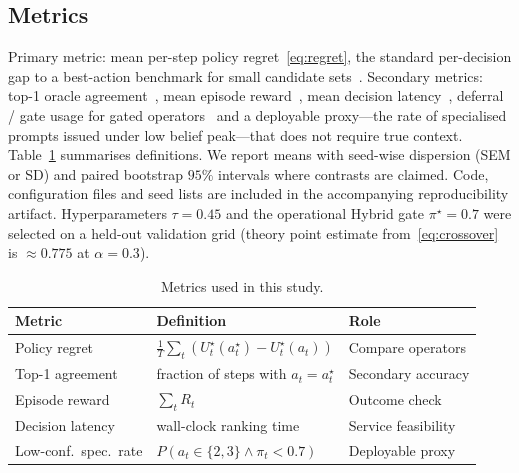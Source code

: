 \documentclass[journal]{IEEEtran}
\begin{document}
\subsection{Metrics}
\label{sec:metrics}

Primary metric: mean per-step policy regret~\eqref{eq:regret}, the standard per-decision gap to a best-action benchmark for small candidate sets~\cite{li2010contextual,lattimore2020bandits,karine2024stepcount}.
Secondary metrics: top-1 oracle agreement~\cite{liu2009ltr,jarvelin2002ndcg}, mean episode reward~\cite{sutton2018rl,karine2024stepcount}, mean decision latency~\cite{reddi2020mlperf,shi2016edge}, deferral / gate usage for gated operators~\cite{elyaniv2010selective,geifman2017selective} and a deployable proxy---the rate of specialised prompts issued under low belief peak---that does not require true context.
Table~\ref{tab:metrics} summarises definitions.
We report means with seed-wise dispersion (SEM or SD) and paired bootstrap \(95\%\) intervals where contrasts are claimed.
Code, configuration files and seed lists are included in the accompanying reproducibility artifact.
Hyperparameters \(\tau=0.45\) and the operational Hybrid gate \(\pi^\star=0.7\) were selected on a held-out validation grid (theory point estimate from~\eqref{eq:crossover} is \(\approx 0.775\) at \(\alpha=0.3\)).

\begin{table}[t]
\centering
\caption{Metrics used in this study.}
\label{tab:metrics}
\footnotesize
\setlength{\tabcolsep}{3.5pt}
\begin{tabularx}{\columnwidth}{@{}l>{\raggedright\arraybackslash}X>{\raggedright\arraybackslash}X@{}}
\toprule
Metric & Definition & Role \\
\midrule
Policy regret & \(\frac{1}{T}\sum_t (U_t^\star(a_t^\star)-U_t^\star(a_t))\) & Compare operators \\
Top-1 agreement & fraction of steps with \(a_t=a_t^\star\) & Secondary accuracy \\
Episode reward & \(\sum_t R_t\) & Outcome check \\
Decision latency & wall-clock ranking time & Service feasibility \\
Low-conf.\ spec.\ rate & \(P(a_t\in\{2,3\}\wedge\pi_t{<}0.7)\) & Deployable proxy \\
\bottomrule
\end{tabularx}
\end{table}

\end{document}
